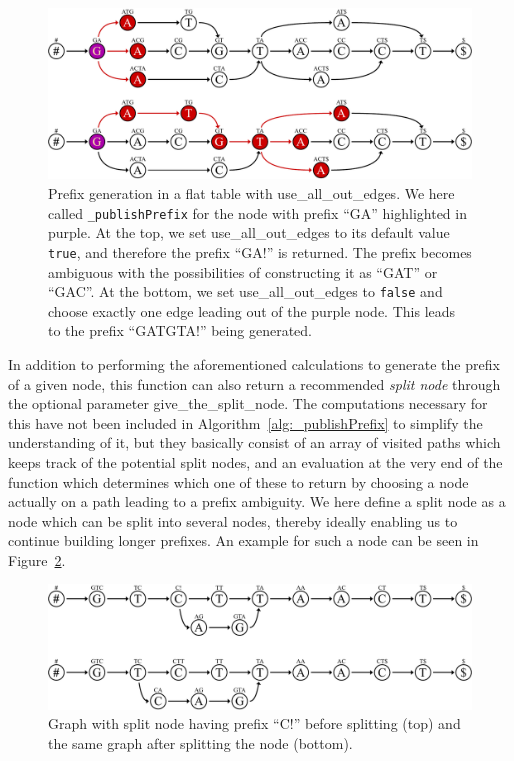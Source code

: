 \documentclass[a4paper,12pt,twoside,BCOR=10mm]{scrbook}
\begin{document}
\begin{figure}[!htb]
\centering
\includegraphics[width=\textwidth]{evo_fig_use_all_out_edges_or_not.pdf}
\caption[Prefix generation in a flat table with use\_all\_out\_edges]{Prefix generation in a flat table with \textup{use\_all\_out\_edges}. We here called \textup{\texttt{\_publishPrefix}} for the node with prefix \textup{“GA”} highlighted in purple. At the top, we set \textup{use\_all\_out\_edges} to its default value \textup{\texttt{true}}, and therefore the prefix \textup{“GA!”} is returned. The prefix becomes ambiguous with the possibilities of constructing it as \textup{“GAT”} or \textup{“GAC”}. At the bottom, we set \textup{use\_all\_out\_edges} to \textup{\texttt{false}} and choose exactly one edge leading out of the purple node. This leads to the prefix \textup{“GATGTA!”} being generated.} \label{fig:evo_fig_use_all_out_edges_or_not}
\end{figure}
In addition to performing the aforementioned calculations to generate the prefix of a given node,
this function can also return a recommended \textit{split node} through the optional parameter give\_the\_split\_node.
The computations necessary for this have not been included in Algorithm~\ref{alg:_publishPrefix} to simplify
the understanding of it, but they basically consist of an array of visited paths which keeps track
of the potential split nodes, and an evaluation at the very end of the function which determines
which one of these to return by choosing a node actually on a path leading to a prefix ambiguity.
We here define a split node as a node which can be split into several nodes, thereby ideally enabling us
to continue building longer prefixes.
An example for such a node can be seen in Figure~\ref{fig:evo_split_node}.
\begin{figure}[!htb]
\centering
\includegraphics[width=\textwidth]{evo_split_node.pdf}
\caption[Graph with split node before and after splitting]{Graph with split node having prefix \textup{“C!”} before splitting (top) and the same graph after splitting the node (bottom).} \label{fig:evo_split_node}
\end{figure}
\end{document}
